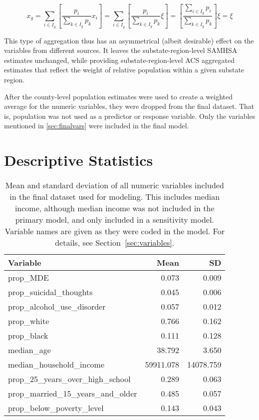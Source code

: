 \documentclass{article}
\begin{document}
\begin{equation*}
    x_g =
    \sum_{i \in I_g}
    \left[ \frac{p_{i}}{\sum_{k \in I_g} p_{k}} x_i \right] =
    \sum_{i \in I_g}
    \left[ \frac{p_{i}}{\sum_{k \in I_g} p_{k}} \xi \right] =
    \left[ \frac{\sum_{i \in I_g}p_{i}}{\sum_{k \in I_g} p_{k}} \right] \xi =
    \xi
\end{equation*}

This type of aggregation thus has an asymmetrical (albeit desirable)
effect on the variables from different sources.
It leaves the substate-region-level SAMHSA estimates unchanged,
while providing substate-region-level ACS aggregated estimates
that reflect the weight of relative population within a given substate region.

After the county-level population estimates were used
to create a weighted average for the numeric variables,
they were dropped from the final dataset.
That is, population was not used as a predictor or response variable.
Only the variables mentioned in \ref{sec:finalvars}
were included in the final model.

\section{Descriptive Statistics}

\begin{table}[!htb]
\begin{center}
\begin{tabular}{l r r}
    \hline
    Variable & Mean & SD\\
    \hline
    prop\_MDE & 0.073 & 0.009\\
    prop\_suicidal\_thoughts & 0.045 & 0.006\\
    prop\_alcohol\_use\_disorder & 0.057 & 0.012\\
    prop\_white & 0.766 & 0.162\\
    prop\_black & 0.111 & 0.128\\
    median\_age & 38.792 & 3.650\\
    median\_household\_income & 59911.078 & 14078.759\\
    prop\_25\_years\_over\_high\_school & 0.289 & 0.063\\
    prop\_married\_15\_years\_and\_older & 0.485 & 0.057\\
    prop\_below\_poverty\_level & 0.143 & 0.043\\
    \hline
\end{tabular}
\end{center}
\caption{\label{tab:summary}Mean and standard deviation of
all numeric variables included in the final dataset used for modeling.
This includes median income, although median income was not included
in the primary model, and only included in a sensitivity model.
Variable names are given as they were coded in the model.
For details, see Section~\ref{sec:variables}.}
\end{table}
\end{document}
